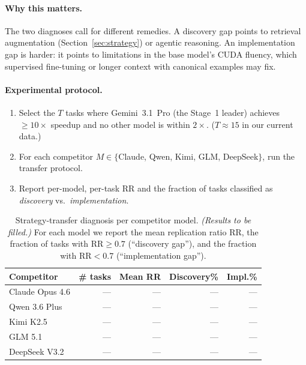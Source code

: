 \documentclass{article}
\begin{document}
\paragraph{Why this matters.}
The two diagnoses call for different remedies. A discovery gap points
to retrieval augmentation (Section~\ref{sec:strategy}) or agentic
reasoning. An implementation gap is harder: it points to limitations
in the base model's CUDA fluency, which supervised fine-tuning or
longer context with canonical examples may fix.

\paragraph{Experimental protocol.}
\begin{enumerate}
  \item Select the $T$ tasks where Gemini~3.1~Pro (the Stage~1
        leader) achieves $\geq 10\times$ speedup and no other model is
        within $2\times$. ($T \approx 15$ in our current data.)
  \item For each competitor $M \in \{$Claude, Qwen, Kimi, GLM,
        DeepSeek$\}$, run the transfer protocol.
  \item Report per-model, per-task RR and the fraction of tasks
        classified as \emph{discovery} vs.\ \emph{implementation}.
\end{enumerate}

\begin{table}[ht]
\centering
\small
\caption{Strategy-transfer diagnosis per competitor model.
\emph{(Results to be filled.)} For each model we report the mean
replication ratio $\mathrm{RR}$, the fraction of tasks with
$\mathrm{RR} \geq 0.7$ (``discovery gap''), and the fraction with
$\mathrm{RR} < 0.7$ (``implementation gap'').}
\label{tab:transfer}
\begin{tabular}{@{}lrrrr@{}}
\toprule
\textbf{Competitor} & \textbf{\# tasks} & \textbf{Mean RR} & \textbf{Discovery\%} & \textbf{Impl.\%} \\
\midrule
Claude Opus 4.6 & --- & --- & --- & --- \\
Qwen 3.6 Plus    & --- & --- & --- & --- \\
Kimi K2.5        & --- & --- & --- & --- \\
GLM 5.1          & --- & --- & --- & --- \\
DeepSeek V3.2    & --- & --- & --- & --- \\
\bottomrule
\end{tabular}
\end{table}
\end{document}
